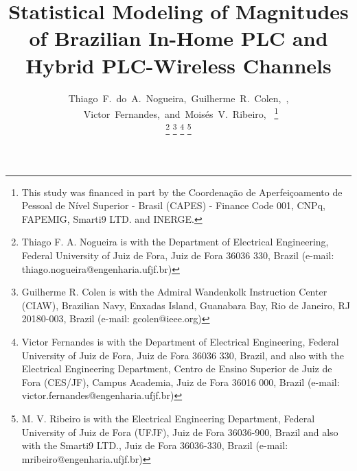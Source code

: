 \documentclass[journal]{IEEEtran}
\begin{document}

\title{Statistical Modeling of Magnitudes of Brazilian In-Home PLC and Hybrid PLC-Wireless Channels}

\author{Thiago~F.~do~A.~Nogueira,~Guilherme~R.~Colen,~,
	~Victor~Fernandes,~and~Mois\'{e}s~V.~Ribeiro,~
\thanks{This study was financed in part by the Coordena\c{c}\~ao de Aperfei\c{c}oamento de Pessoal de N\'ivel Superior - Brasil (CAPES) - Finance Code 001, CNPq, FAPEMIG, Smarti9 LTD. and INERGE.} 

\thanks{Thiago F. A. Nogueira is with the Department of Electrical Engineering, Federal University of Juiz de Fora, Juiz de Fora 36036 330, Brazil (e-mail: thiago.nogueira@engenharia.ufjf.br)} 
\thanks{Guilherme R. Colen is with the Admiral Wandenkolk Instruction Center (CIAW), Brazilian Navy, Enxadas Island, Guanabara Bay, Rio de Janeiro, RJ 20180-003, Brazil (e-mail: gcolen@ieee.org)}
\thanks{Victor Fernandes is with the Department of Electrical Engineering, Federal University of Juiz de Fora, Juiz de Fora 36036 330, Brazil, and also with the Electrical Engineering Department, Centro de Ensino Superior de Juiz de Fora (CES/JF), Campus Academia, Juiz de Fora 36016 000, Brazil  (e-mail: victor.fernandes@engenharia.ufjf.br) }
\thanks{M. V. Ribeiro  is with the Electrical Engineering Department, Federal University of Juiz de Fora (UFJF), Juiz de Fora 36036-900, Brazil and also with the Smarti9 LTD., Juiz de Fora 36036-330, Brazil (e-mail: mribeiro@engenharia.ufjf.br)}}


\maketitle
\end{document}
